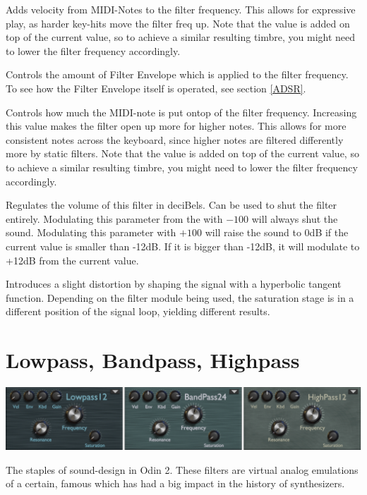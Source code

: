 {Adds velocity from MIDI-Notes to the filter frequency. This allows for expressive play, as harder key-hits move the filter freq up. Note that the value is added on top of the current value, so to achieve a similar resulting timbre, you might need to lower the filter frequency accordingly.}

{Controls the amount of Filter Envelope which is applied to the filter frequency. To see how the Filter Envelope itself is operated, see section \ref{ADSR}.}

{Controls how much the MIDI-note is put ontop of the filter frequency. Increasing this value makes the filter open up more for higher notes. This allows for more consistent notes across the keyboard, since higher notes are filtered differently more by static filters. Note that the value is added on top of the current value, so to achieve a similar resulting timbre, you might need to lower the filter frequency accordingly.}

{Regulates the volume of this filter in deciBels. Can be used to shut the filter entirely. Modulating this parameter from the \modmatrix  with $-100$ will always shut the sound. Modulating this parameter with $+100$ will raise the sound to 0dB if the current value is smaller than -12dB. If it is bigger than -12dB, it will modulate to +12dB from the current value.}

{Introduces a slight distortion by shaping the signal with a hyperbolic tangent function. Depending on the filter module being used, the saturation stage is in a different position of the signal loop, yielding different results.}

\section{Lowpass, Bandpass, Highpass}
\begin{center}
    \includegraphics[width=\textwidth]{graphics/lp_bp_hp.png}
\end{center}

The staples of sound-design in Odin 2. These filters are virtual analog emulations of a certain, famous  which has had a big impact in the history of synthesizers.

